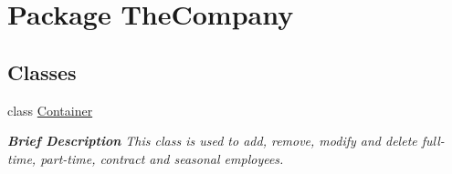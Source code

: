\hypertarget{namespace_the_company}{}\section{Package The\+Company}
\label{namespace_the_company}
\subsection*{Classes}
\begin{DoxyCompactItemize}
\item 
class \hyperlink{class_the_company_1_1_container}{Container}
\begin{DoxyCompactList}\small\item\em {\bfseries Brief Description} This class is used to add, remove, modify and delete full-\/time, part-\/time, contract and seasonal employees. \end{DoxyCompactList}\end{DoxyCompactItemize}
